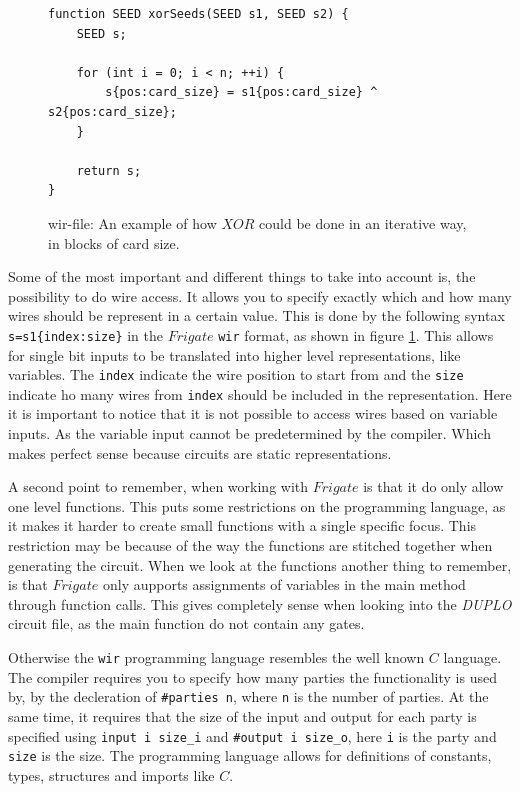 \documentclass[twoside,11pt,openright]{report}
\newcommand{\DUPLO}{\textit{DUPLO} }
\begin{document}
\begin{figure}[t]
\begin{verbatim}
function SEED xorSeeds(SEED s1, SEED s2) {
    SEED s;
    
    for (int i = 0; i < n; ++i) {
        s{pos:card_size} = s1{pos:card_size} ^ s2{pos:card_size};
    }

    return s;
}
\end{verbatim}
\caption{wir-file: An example of how $XOR$ could be done in an iterative way, in blocks of card size.}
\label{fig:wir_ex}
\end{figure}

Some of the most important and different things to take into account is, the possibility to do wire access. It allows you to specify exactly which and how many wires should be represent in a certain value. This is done by the following syntax \verb|s=s1{index:size}| in the $Frigate$ \verb|wir| format, as shown in figure \ref{fig:wir_ex}. This allows for single bit inputs to be translated into higher level representations, like variables. The \verb|index| indicate the wire position to start from and the \verb|size| indicate ho many wires from \verb|index| should be included in the representation. Here it is important to notice that it is not possible to access wires based on variable inputs. As the variable input cannot be predetermined by the compiler. Which makes perfect sense because circuits are static representations.

A second point to remember, when working with $Frigate$ is that it do only allow one level functions. This puts some restrictions on the programming language, as it makes it harder to create small functions with a single specific focus. This restriction  may be because of the way the functions are stitched together when generating the circuit. When we look at the functions another thing to remember, is that $Frigate$ only aupports assignments of variables in the main method through function calls. This gives completely sense when looking into the \DUPLO circuit file, as the main function do not contain any gates.

Otherwise the \verb|wir| programming language resembles the well known $C$ language. The compiler requires you to specify how many parties the functionality is used by, by the decleration of \verb|#parties n|, where \verb|n| is the number of parties. At the same time, it requires that the size of the input and output for each party is specified using \verb|input i size_i| and \verb|#output i size_o|, here \verb|i| is the party and \verb|size| is the size. The programming language allows for definitions of constants, types, structures and imports like $C$.
\end{document}
